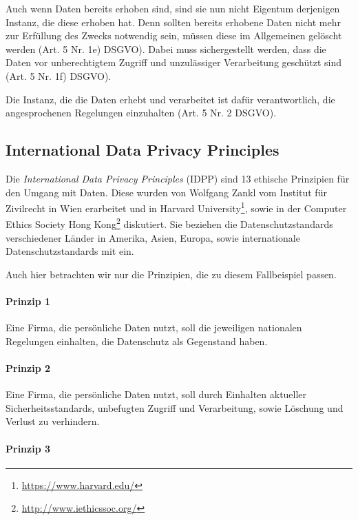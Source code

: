 Auch wenn Daten bereits erhoben sind, sind sie nun nicht Eigentum derjenigen Instanz, die diese erhoben hat. Denn sollten bereits erhobene Daten nicht mehr zur Erfüllung des Zwecks notwendig sein, müssen diese im Allgemeinen gelöscht werden (Art. 5 Nr. 1e) DSGVO).
Dabei muss sichergestellt werden, dass die Daten vor unberechtigtem Zugriff und unzulässiger Verarbeitung geschützt sind (Art. 5 Nr. 1f) DSGVO).

Die Instanz, die die Daten erhebt und verarbeitet ist dafür verantwortlich, die angesprochenen Regelungen einzuhalten (Art. 5 Nr. 2 DSGVO).


\subsection{International Data Privacy Principles}

Die \emph{International Data Privacy Principles} \cite{zankl_international_2014} (IDPP) sind 13 ethische Prinzipien für den Umgang mit Daten.
Diese wurden von Wolfgang Zankl vom Institut für Zivilrecht in Wien erarbeitet und in Harvard University\footnote{\url{https://www.harvard.edu/}}, sowie in der Computer Ethics Society Hong Kong\footnote{\url{http://www.iethicssoc.org/}} diskutiert.
Sie beziehen die Datenschutzstandards verschiedener Länder in Amerika, Asien, Europa, sowie internationale Datenschutzstandards mit ein.

Auch hier betrachten wir nur die Prinzipien, die zu diesem Fallbeispiel passen.

\paragraph*{Prinzip 1}

Eine Firma, die persönliche Daten nutzt, soll die jeweiligen nationalen Regelungen einhalten, die Datenschutz als Gegenstand haben.

\paragraph*{Prinzip 2}

Eine Firma, die persönliche Daten nutzt, soll durch Einhalten aktueller Sicherheitsstandards, unbefugten Zugriff und Verarbeitung, sowie Löschung und Verlust zu verhindern.

\paragraph*{Prinzip 3}

